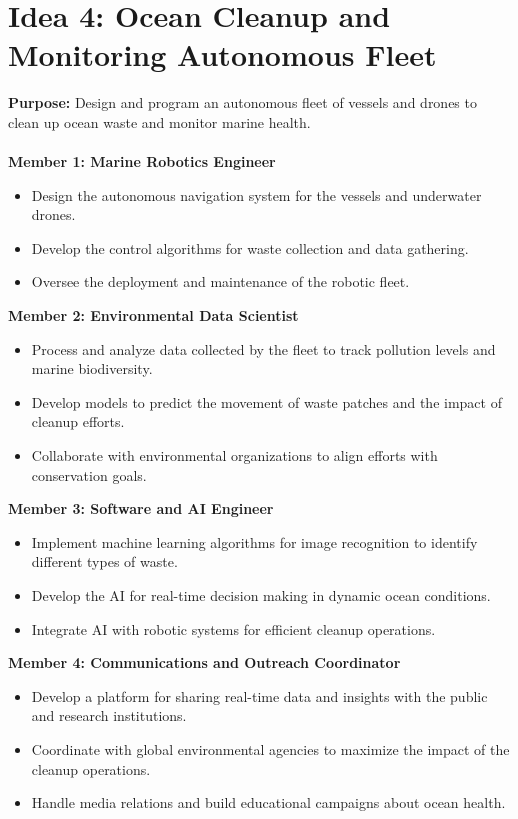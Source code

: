 \documentclass{article}
\begin{document}
\newpage \section{Idea 4: Ocean Cleanup and Monitoring Autonomous Fleet}
    \textbf{Purpose:} Design and program an autonomous fleet of vessels and drones to clean up ocean waste and monitor marine health. \\ \\
    \textbf{Member 1: Marine Robotics Engineer}
        \begin{itemize}
            \item Design the autonomous navigation system for the vessels and underwater drones.
            \item Develop the control algorithms for waste collection and data gathering.
            \item Oversee the deployment and maintenance of the robotic fleet.
        \end{itemize}
    \textbf{Member 2: Environmental Data Scientist}
        \begin{itemize}
            \item Process and analyze data collected by the fleet to track pollution levels and marine biodiversity.
            \item Develop models to predict the movement of waste patches and the impact of cleanup efforts.
            \item Collaborate with environmental organizations to align efforts with conservation goals.
        \end{itemize}
    \textbf{Member 3: Software and AI Engineer}
        \begin{itemize}
            \item Implement machine learning algorithms for image recognition to identify different types of waste.
            \item Develop the AI for real-time decision making in dynamic ocean conditions.
            \item Integrate AI with robotic systems for efficient cleanup operations.
        \end{itemize}
    \textbf{Member 4: Communications and Outreach Coordinator}
        \begin{itemize}
            \item Develop a platform for sharing real-time data and insights with the public and research institutions.
            \item Coordinate with global environmental agencies to maximize the impact of the cleanup operations.
            \item Handle media relations and build educational campaigns about ocean health.
        \end{itemize}

\end{document}
